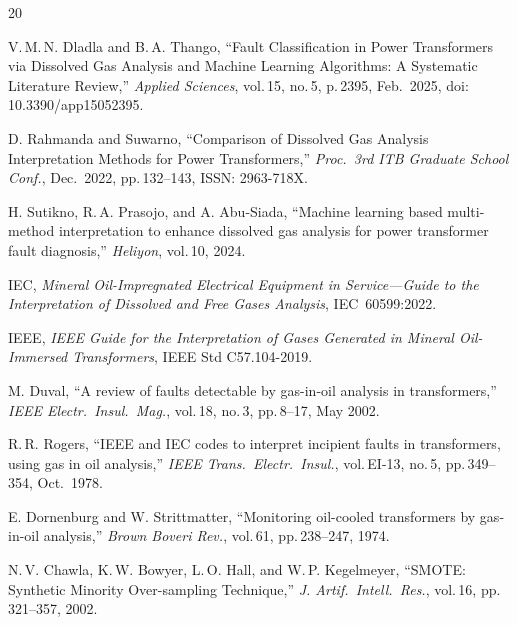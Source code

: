 \documentclass[conference]{IEEEtran}
\begin{document}
\begin{thebibliography}{20}

V.\,M.\,N. Dladla and B.\,A. Thango,
``Fault Classification in Power Transformers via Dissolved Gas Analysis
and Machine Learning Algorithms: A Systematic Literature Review,''
\textit{Applied Sciences}, vol.\,15, no.\,5, p.\,2395, Feb.\ 2025,
doi: 10.3390/app15052395.

D. Rahmanda and Suwarno,
``Comparison of Dissolved Gas Analysis Interpretation Methods for
Power Transformers,''
\textit{Proc.\ 3rd ITB Graduate School Conf.}, Dec.\ 2022,
pp.\,132--143, ISSN: 2963-718X.

H. Sutikno, R.\,A. Prasojo, and A. Abu-Siada,
``Machine learning based multi-method interpretation to enhance
dissolved gas analysis for power transformer fault diagnosis,''
\textit{Heliyon}, vol.\,10, 2024.

IEC, \textit{Mineral Oil-Impregnated Electrical Equipment in
Service---Guide to the Interpretation of Dissolved and Free Gases
Analysis}, IEC~60599:2022.

IEEE, \textit{IEEE Guide for the Interpretation of Gases Generated
in Mineral Oil-Immersed Transformers}, IEEE Std C57.104-2019.

M. Duval,
``A review of faults detectable by gas-in-oil analysis in transformers,''
\textit{IEEE Electr.\ Insul.\ Mag.}, vol.\,18, no.\,3, pp.\,8--17,
May 2002.

R.\,R. Rogers,
``IEEE and IEC codes to interpret incipient faults in transformers,
using gas in oil analysis,''
\textit{IEEE Trans.\ Electr.\ Insul.}, vol.\,EI-13, no.\,5,
pp.\,349--354, Oct.\ 1978.

E. Dornenburg and W. Strittmatter,
``Monitoring oil-cooled transformers by gas-in-oil analysis,''
\textit{Brown Boveri Rev.}, vol.\,61, pp.\,238--247, 1974.

N.\,V. Chawla, K.\,W. Bowyer, L.\,O. Hall, and W.\,P. Kegelmeyer,
``SMOTE: Synthetic Minority Over-sampling Technique,''
\textit{J. Artif.\ Intell.\ Res.}, vol.\,16, pp.\,321--357, 2002.


\end{thebibliography}
\end{document}
